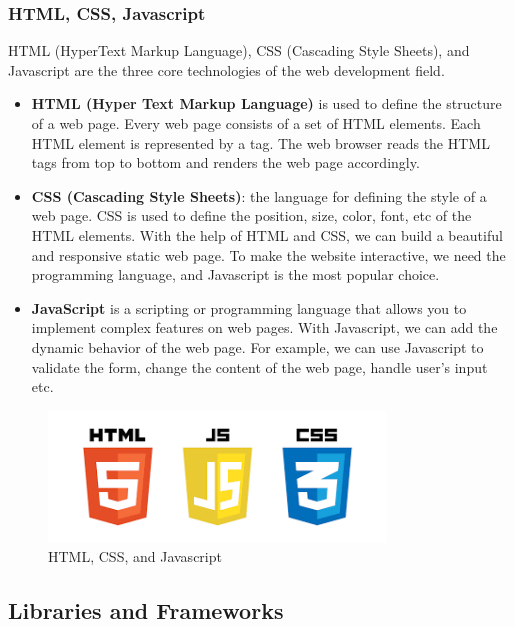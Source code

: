 \subsubsection{HTML, CSS, Javascript}
HTML (HyperText Markup Language), CSS (Cascading Style Sheets), and Javascript are the three core technologies of the web development field. 
\begin{itemize}

    \item \textbf{HTML (Hyper Text Markup Language)} is used to define the structure of a web page. Every web page consists of a set of HTML elements. Each HTML element is represented by a tag. The web browser reads the HTML tags from top to bottom and renders the web page accordingly.

    \item \textbf{CSS (Cascading Style Sheets)}: the language for defining the style of a web page. CSS is used to define the position, size, color, font, etc of the HTML elements. With the help of HTML and CSS, we can build a beautiful and responsive static web page. To make the website interactive, we need the programming language, and Javascript is the most popular choice.

    \item \textbf{JavaScript} is a scripting or programming language that allows you to implement complex features on web pages. With Javascript, we can add the dynamic behavior of the web page. For example, we can use Javascript to validate the form, change the content of the web page, handle user's input etc.
\end{itemize}

\begin{figure}[ht]
    \centering
    \includegraphics[width=0.8\textwidth]{../Images/8.Technology_Stack/html_css_js.png}
    \caption{HTML, CSS, and Javascript}
    \label{fig:html_css_javascript}
\end{figure}

\subsection{Libraries and Frameworks}
